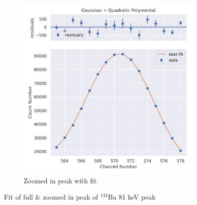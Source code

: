 \documentclass[11pt,a4paper]{article}
\newcommand{\element}[2]{$^{#2}\textrm{#1}$}
\begin{document}
\begin{figure}[H]
\begin{subfigure}{.5\linewidth}
    \includegraphics[width=\linewidth]{./Images/Barium133/Quad/Quad_1_Zoom.png}
    \caption{Zoomed in peak with fit}
  \end{subfigure}
  \caption{Fit of full \& zoomed in peak of \element{Ba}{133} 81 keV peak}
\end{figure}
\end{document}
